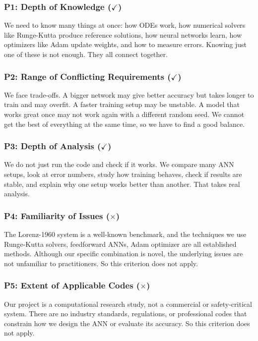 \subsubsection{P1: Depth of Knowledge ($\checkmark$)}

We need to know many things at once: how ODEs work, how numerical solvers like Runge-Kutta produce reference solutions, how neural networks learn, how optimizers like Adam update weights, and how to measure errors. Knowing just one of these is not enough. They all connect together.

\subsubsection{P2: Range of Conflicting Requirements ($\checkmark$)}

We face trade-offs. A bigger network may give better accuracy but takes longer to train and may overfit. A faster training setup may be unstable. A model that works great once may not work again with a different random seed. We cannot get the best of everything at the same time, so we have to find a good balance.

\subsubsection{P3: Depth of Analysis ($\checkmark$)}

We do not just run the code and check if it works. We compare many ANN setups, look at error numbers, study how training behaves, check if results are stable, and explain why one setup works better than another. That takes real analysis.

\subsubsection{P4: Familiarity of Issues ($\times$)}

The Lorenz-1960 system is a well-known benchmark, and the techniques we use Runge-Kutta solvers, feedforward ANNs, Adam optimizer are all established methods. Although our specific combination is novel, the underlying issues are not unfamiliar to practitioners. So this criterion does not apply.

\subsubsection{P5: Extent of Applicable Codes ($\times$)}

Our project is a computational research study, not a commercial or safety-critical system. There are no industry standards, regulations, or professional codes that constrain how we design the ANN or evaluate its accuracy. So this criterion does not apply.

